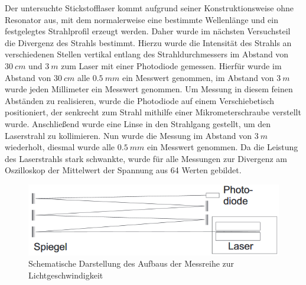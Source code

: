 \documentclass[
	a4paper,
	12pt,
	pagesize,
	ngerman
]{scrartcl}
\begin{document}
Der untersuchte Stickstofflaser kommt aufgrund seiner Konstruktionsweise ohne Resonator aus, mit dem normalerweise eine bestimmte Wellenlänge und ein festgelegtes Strahlprofil erzeugt werden. Daher wurde im nächsten Versuchsteil die Divergenz des Strahls bestimmt. Hierzu wurde die Intensität des Strahls an verschiedenen Stellen vertikal entlang des Strahldurchmessers im Abstand von $\SI{30}{cm}$ und $\SI{3}{m}$ zum Laser mit einer Photodiode gemessen. Hierfür wurde im Abstand von $\SI{30}{cm}$ alle $\SI{0,5}{mm}$ ein Messwert genommen, im Abstand von $\SI{3}{m}$ wurde jeden Millimeter ein Messwert genommen. Um Messung in diesem feinen Abständen zu realisieren, wurde die Photodiode auf einem Verschiebetisch positioniert, der senkrecht zum Strahl mithilfe einer Mikrometerschraube verstellt wurde.
Anschließend wurde eine Linse in den Strahlgang gestellt, um den Laserstrahl zu kollimieren. Nun wurde die Messung im Abstand von $\SI{3}{m}$ wiederholt, diesmal wurde alle $\SI{0,5}{mm}$ ein Messwert genommen. Da die Leistung des Laserstrahls stark schwankte, wurde für alle Messungen zur Divergenz am Oszilloskop der Mittelwert der Spannung aus 64 Werten gebildet.

\begin{figure}[h!]
	\centering
	\includegraphics[scale=0.9]{skizze_c.png}
	\caption{Schematische Darstellung des Aufbaus der Messreihe zur Lichtgeschwindigkeit}
	\label{skizze_c}
\end{figure}
\end{document}
